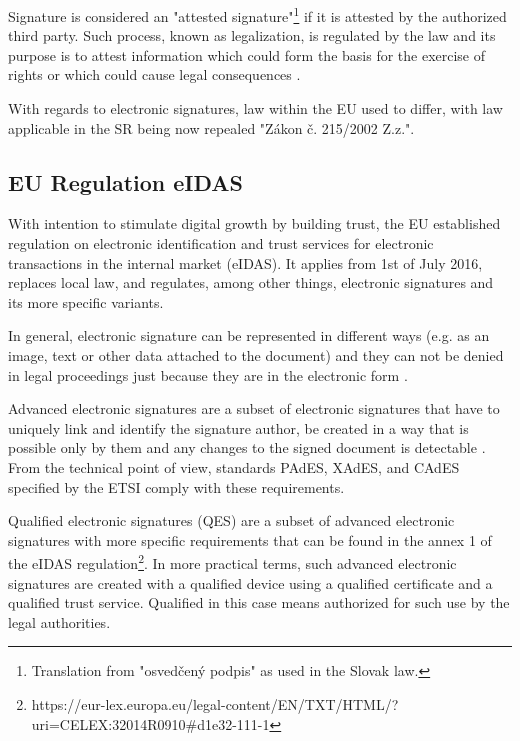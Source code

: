 \documentclass[thesismargins, english, thesislinespacing, twoside, openright, upjsfrontpage]{rnthesis}
\begin{document}
Signature is considered an "attested signature"\footnote{Translation from "osvedčený podpis" as used in the Slovak law.} if it is attested by the authorized third party.
Such process, known as legalization, is regulated by the law and its purpose is to attest information which could form the basis for the exercise of rights or which could cause legal consequences \cite{3}.

With regards to electronic signatures, law within the EU used to differ, with law applicable in the SR being now repealed "Zákon č. 215/2002 Z.z.".

\subsection{EU Regulation eIDAS}

With intention to stimulate digital growth by building trust, the EU established regulation on electronic identification and trust services for electronic transactions in the internal market (eIDAS).
It applies from 1st of July 2016, replaces local law, and regulates, among other things, electronic signatures and its more specific variants.


In general, electronic signature can be represented in different ways (e.g. as an image, text or other data attached to the document) and they can not be denied in legal proceedings just because they are in the electronic form \cite{4}.

Advanced electronic signatures are a subset of electronic signatures that have to uniquely link and identify the signature author, be created in a way that is possible only by them and any changes to the signed document is detectable \cite{5}.
From the technical point of view, standards PAdES, XAdES, and CAdES specified by the ETSI comply with these requirements.

Qualified electronic signatures (QES) are a subset of advanced electronic signatures with more specific requirements that can be found in the annex 1 of the eIDAS regulation\footnote{https://eur-lex.europa.eu/legal-content/EN/TXT/HTML/?uri=CELEX:32014R0910\#d1e32-111-1}.
In more practical terms, such advanced electronic signatures are created with a qualified device using a qualified certificate and a qualified trust service. Qualified in this case means authorized for such use by the legal authorities.
\end{document}
